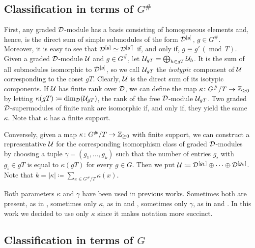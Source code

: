 \subsection{Classification in terms of $G^\#$}\label{U-in-terms-of-GxZZ2}

First, any graded $\mathcal{D}$-module has a basis consisting of homogeneous elements and, hence, is the direct sum of simple submodules of the form $\mathcal{D}^{[g]}$, $g \in G^\#$.
Moreover, it is easy to see that $\mathcal{D}^{[g]}\simeq \mathcal{D}^{[g']}$ if, and only if,  $g \equiv g' \,(\operatorname{mod}\, T)$.
Given a graded $\mathcal{D}$-module $\mathcal U$ and $g\in G^\#$, let $\mathcal U_{gT} = \bigoplus_{h \in gT} \mathcal U_{h}$.
It is the sum of all submodules isomorphic to $\mathcal{D}^{[g]}$, so we call $\mathcal U_{gT}$ the \emph{isotypic} component of $\mathcal U$ corresponding to the coset $gT$.
Clearly, $\mathcal U$ is the direct sum of its isotypic components.
If $\mathcal U$ has finite rank over $\mathcal{D}$, we can define the map $\kappa\colon G^\#/T \to \mathbb{Z}_{\geq 0}$ by letting $\kappa (gT) \coloneqq \dim_{\mathcal{D}} (\mathcal U_{gT})$, the rank of the free $\mathcal{D}$-module $\mathcal U_{gT}$.
Two graded $\mathcal{D}$-supermodules of finite rank are isomorphic if, and only if, they yield the same $\kappa$.
Note that $\kappa$ has a finite support.

Conversely, given a map $\kappa\colon G^\#/T \to \mathbb{Z}_{\geq 0}$ with finite support, we can construct a representative $\mathcal U$ for the corresponding isomorphism class of graded $\mathcal{D}$-modules by choosing a tuple $\gamma = (g_1, \ldots, g_k)$ such that the number of entries $g_i$ with $g_i\in gT$ is equal to $\kappa (gT)$ for every $g\in G$.
Then we put $\mathcal U \coloneqq \mathcal{D}^{[g_1]} \oplus \cdots \oplus \mathcal{D}^{[g_k]}$.
Note that $k = |\kappa| \coloneqq \sum_{x\in G^\#/T} \kappa(x)$.

\begin{remark}
	Both parameters $\kappa$ and $\gamma$ have been used in previous works.
	Sometimes both are present, as in \cite{livromicha}, sometimes only $\kappa$, as in \cite{paper-adrian} and \cite{felipe-misha}, sometimes only $\gamma$, as in \cite{paper-Qn} and \cite{paper-MAP}.
	In this work we decided to use only $\kappa$ since it makes notation more succinct.
\end{remark}

\subsection{Classification in terms of $G$}

